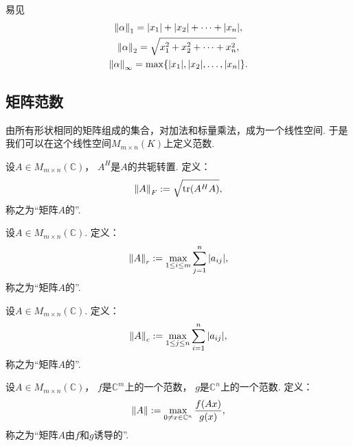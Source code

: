 易见\begin{gather}
	\norm{\alpha}_1 = \abs{x_1} + \abs{x_2} + \dotsb + \abs{x_n}, \\
	\norm{\alpha}_2 = \sqrt{x_1^2 + x_2^2 + \dotsb + x_n^2}, \\
	\norm{\alpha}_\infty = \max\{\abs{x_1},\abs{x_2},\dotsc,\abs{x_n}\}.
\end{gather}

\subsection{矩阵范数}
由所有形状相同的矩阵组成的集合，对加法和标量乘法，成为一个线性空间.
于是我们可以在这个线性空间\(M_{m \times n}(K)\)上定义范数.

\begin{definition}
设\(A \in M_{m \times n}(\mathbb{C})\)，
\(A^H\)是\(A\)的共轭转置.
定义：\begin{equation}
	\norm{A}_F
	:=
	\sqrt{
		\tr(A^H A)
	},
\end{equation}
称之为“矩阵\(A\)的”.
\end{definition}

\begin{definition}
设\(A \in M_{m \times n}(\mathbb{C})\).
定义：\begin{equation}
	\norm{A}_r
	:=
	\max_{1 \leq i \leq m} \sum_{j=1}^n \abs{a_{ij}},
\end{equation}
称之为“矩阵\(A\)的”.
\end{definition}

\begin{definition}
设\(A \in M_{m \times n}(\mathbb{C})\).
定义：\begin{equation}
	\norm{A}_c
	:=
	\max_{1 \leq j \leq n} \sum_{i=1}^n \abs{a_{ij}},
\end{equation}
称之为“矩阵\(A\)的”.
\end{definition}

\begin{definition}
设\(A \in M_{m \times n}(\mathbb{C})\)，
\(f\)是\(\mathbb{C}^m\)上的一个范数，
\(g\)是\(\mathbb{C}^n\)上的一个范数.
定义：\begin{equation}
	\norm{A}
	:=
	\max_{0 \neq x \in \mathbb{C}^n} \frac{f(Ax)}{g(x)},
\end{equation}
称之为“矩阵\(A\)由\(f\)和\(g\)诱导的”.
\end{definition}

